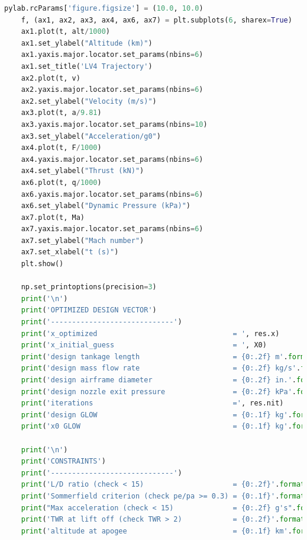 \documentclass[]{aiaa-tc}%
\begin{document}
\begin{lstlisting}[language=Python]
    pylab.rcParams['figure.figsize'] = (10.0, 10.0)
    f, (ax1, ax2, ax3, ax4, ax6, ax7) = plt.subplots(6, sharex=True)
    ax1.plot(t, alt/1000)
    ax1.set_ylabel("Altitude (km)")
    ax1.yaxis.major.locator.set_params(nbins=6)
    ax1.set_title('LV4 Trajectory')
    ax2.plot(t, v)
    ax2.yaxis.major.locator.set_params(nbins=6)
    ax2.set_ylabel("Velocity (m/s)")
    ax3.plot(t, a/9.81)
    ax3.yaxis.major.locator.set_params(nbins=10)
    ax3.set_ylabel("Acceleration/g0")
    ax4.plot(t, F/1000)
    ax4.yaxis.major.locator.set_params(nbins=6)
    ax4.set_ylabel("Thrust (kN)")
    ax6.plot(t, q/1000)
    ax6.yaxis.major.locator.set_params(nbins=6)
    ax6.set_ylabel("Dynamic Pressure (kPa)")
    ax7.plot(t, Ma)
    ax7.yaxis.major.locator.set_params(nbins=6) 
    ax7.set_ylabel("Mach number")
    ax7.set_xlabel("t (s)")
    plt.show()
    
    np.set_printoptions(precision=3)
    print('\n')
    print('OPTIMIZED DESIGN VECTOR')
    print('-----------------------------')
    print('x_optimized                                = ', res.x)
    print('x_initial_guess                            = ', X0)
    print('design tankage length                      = {0:.2f} m'.format(res.x[0]))
    print('design mass flow rate                      = {0:.2f} kg/s'.format(res.x[1]))
    print('design airframe diameter                   = {0:.2f} in.'.format(res.x[2]))
    print('design nozzle exit pressure                = {0:.2f} kPa'.format(res.x[3]))
    print('iterations                                 =', res.nit)
    print('design GLOW                                = {0:.1f} kg'.format(m[0]))
    print('x0 GLOW                                    = {0:.1f} kg'.format(trajectory(X0[0], X0[1], X0[2], X0[3], p_ch)[-4][0]))
    
    print('\n')
    print('CONSTRAINTS')
    print('-----------------------------')
    print('L/D ratio (check < 15)                     = {0:.2f}'.format((L+2)/(dia*0.0254)))
    print('Sommerfield criterion (check pe/pa >= 0.3) = {0:.1f}'.format(S_crit))
    print("Max acceleration (check < 15)              = {0:.2f} g's".format(max(abs(a))/9.81))
    print('TWR at lift off (check TWR > 2)            = {0:.2f}'.format(TWR))
    print('altitude at apogee                         = {0:.1f} km'.format(alt[-1]/1000))
    

\end{lstlisting}
\end{document}
